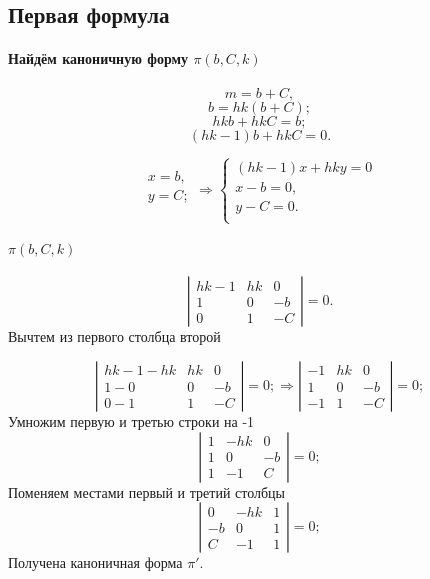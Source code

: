 \subsection{Первая формула}
\paragraph{Найдём каноничную форму $\pi(b, C, k)$}
$$m = b + C,$$
$$b = h k \left( b+ C \right);$$
$$h k b + h k C = b;$$
$$\left(h k -1\right) b + h k C = 0.$$

$$
\begin{array}{l}
x = b,\\
y = C;\\
\end{array}
\Rightarrow
\left\{
	\begin{array}{l}
		\left(h k -1\right) x + h k y = 0 \\
		x - b = 0,\\
		y - C = 0.\\
	\end{array}
\right.
$$

\paragraph{$\pi(b, C, k)$}
$$
\left|
\begin{array}{lll}
	h k -1 & hk & 0 \\
	1 & 0 & -b \\
	0 & 1 & -C
\end{array}
\right|
=0.
$$
Вычтем из первого столбца второй

$$
\left|
\begin{array}{lll}
	h k -1 - hk & hk & 0 \\
	1     - 0  & 0  & -b \\
	0     - 1  & 1  & -C
\end{array}
\right|
=0;
\Rightarrow
\left|
\begin{array}{lll}
	-1 & hk & 0 \\
	1  & 0  & -b \\
	-1 & 1  & -C
\end{array}
\right|
=0;
$$
Умножим первую и третью строки на -1
$$
\left|
\begin{array}{lll}
	1 & -hk & 0 \\
	1 & 0   & -b \\
	1 & -1  & C
\end{array}
\right|
=0;
$$
Поменяем местами первый и третий столбцы
$$
\left|
\begin{array}{lll}
	0  & -hk & 1 \\
	-b  & 0   & 1 \\
	C & -1  & 1 
\end{array}
\right|
=0;
$$
Получена каноничная форма $\pi'$.
